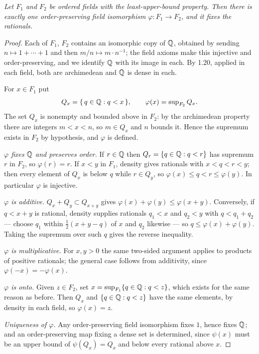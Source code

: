 \emph{Let $F_1$ and $F_2$ be ordered fields with the least-upper-bound
property. Then there is exactly one order-preserving field isomorphism
$\varphi : F_1 \to F_2$, and it fixes the rationals.}

\begin{proof}
Each of $F_1$, $F_2$ contains an isomorphic copy of $\mathbb{Q}$, obtained by sending
$n \mapsto 1 + \cdots + 1$ and then $m/n \mapsto m \cdot n^{-1}$; the field
axioms make this injective and order-preserving, and we identify $\mathbb{Q}$ with
its image in each. By 1.20, applied in each field, both are archimedean and
$\mathbb{Q}$ is dense in each.

For $x \in F_1$ put
\[ Q_x = \{\,q \in \mathbb{Q} : q < x\,\}, \qquad
   \varphi(x) = \sup\nolimits_{F_2} Q_x . \]
The set $Q_x$ is nonempty and bounded above in $F_2$: by the archimedean
property there are integers $m < x < n$, so $m \in Q_x$ and $n$ bounds it.
Hence the supremum exists in $F_2$ by hypothesis, and $\varphi$ is defined.

\emph{$\varphi$ fixes $\mathbb{Q}$ and preserves order.} If $r \in \mathbb{Q}$ then
$Q_r = \{q \in \mathbb{Q} : q < r\}$ has supremum $r$ in $F_2$, so $\varphi(r)=r$. If
$x < y$ in $F_1$, density gives rationals with $x < q < r < y$; then every
element of $Q_x$ is below $q$ while $r \in Q_y$, so
$\varphi(x) \le q < r \le \varphi(y)$. In particular $\varphi$ is injective.

\emph{$\varphi$ is additive.} $Q_x + Q_y \subset Q_{x+y}$ gives
$\varphi(x)+\varphi(y) \le \varphi(x+y)$. Conversely, if $q < x+y$ is
rational, density supplies rationals $q_1 < x$ and $q_2 < y$ with
$q < q_1+q_2$ --- choose $q_1$ within $\tfrac12(x+y-q)$ of $x$ and $q_2$
likewise --- so $q \le \varphi(x)+\varphi(y)$. Taking the supremum over such
$q$ gives the reverse inequality.

\emph{$\varphi$ is multiplicative.} For $x,y>0$ the same two-sided argument
applies to products of positive rationals; the general case follows from
additivity, since $\varphi(-x) = -\varphi(x)$.

\emph{$\varphi$ is onto.} Given $z \in F_2$, set
$x = \sup_{F_1}\{q \in \mathbb{Q} : q < z\}$, which exists for the same reason as
before. Then $Q_x$ and $\{q \in \mathbb{Q} : q < z\}$ have the same elements, by
density in each field, so $\varphi(x) = z$.

\emph{Uniqueness of $\varphi$.} Any order-preserving field isomorphism fixes
$1$, hence fixes $\mathbb{Q}$; and an order-preserving map fixing a dense set is
determined, since $\psi(x)$ must be an upper bound of $\psi(Q_x) = Q_x$ and
below every rational above $x$.
\end{proof}

